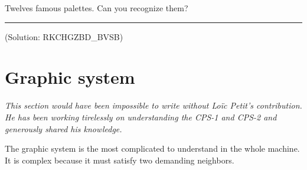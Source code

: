 


\pagebreak




Twelves famous palettes. Can you recognize them?









\par\noindent\rule{\textwidth}{0.4pt}





 (Solution: RKCHGZBD\_BVSB)














\section{Graphic system}

\emph{This section would have been impossible to write without Lo\"{i}c Petit's contribution. He has been working tirelessly on understanding the CPS-1 and CPS-2 and generously shared his knowledge.}

The graphic system is the most complicated to understand in the whole machine. It is complex because it must satisfy two demanding neighbors.

